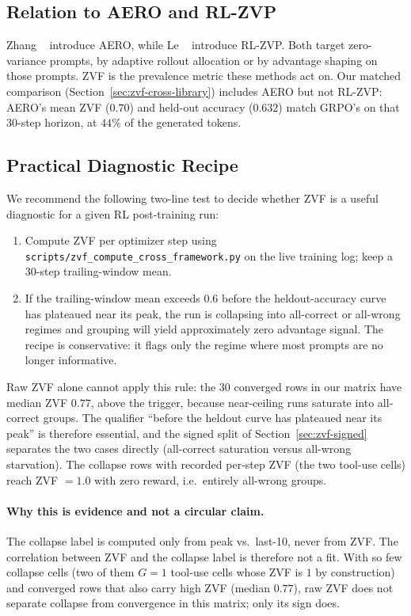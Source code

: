 \subsection{Relation to AERO and RL-ZVP}
\label{sec:zvf-cross-experiment:aero}

Zhang \etal~\cite{zhang2026aero} introduce AERO, while
Le \etal~\cite{le2025rlzvp} introduce RL-ZVP. Both target zero-variance prompts,
by adaptive rollout allocation or by advantage shaping on those prompts. ZVF is
the prevalence metric these methods act on. Our matched comparison
(Section~\ref{sec:zvf-cross-library}) includes AERO but not RL-ZVP: AERO's mean ZVF
($0.70$) and held-out accuracy ($0.632$) match GRPO's on that 30-step horizon,
at $44\%$ of the generated tokens.

\subsection{Practical Diagnostic Recipe}

We recommend the following two-line test to decide whether ZVF is
a useful diagnostic for a given RL post-training run:
\begin{enumerate}
\item Compute ZVF per optimizer step using
      \texttt{scripts/zvf\_compute\_cross\_framework.py} on the live
      training log; keep a $30$-step trailing-window mean.
\item If the trailing-window mean exceeds $0.6$ before the
      heldout-accuracy curve has plateaued near its peak, the run
      is collapsing into all-correct or all-wrong regimes and
      grouping will yield approximately zero advantage signal. The
      recipe is conservative: it flags only the regime where most
      prompts are no longer informative.
\end{enumerate}
Raw ZVF alone cannot apply this rule: the 30 converged rows in our matrix have
median ZVF $0.77$, above the trigger, because near-ceiling runs saturate into
all-correct groups. The qualifier ``before the heldout curve has plateaued near
its peak'' is therefore essential, and the signed split of
Section~\ref{sec:zvf-signed} separates the two cases directly (all-correct
saturation versus all-wrong starvation). The collapse rows with recorded per-step
ZVF (the two tool-use cells) reach ZVF $=1.0$ with zero reward, i.e.\ entirely
all-wrong groups.

\paragraph{Why this is evidence and not a circular claim.}
The collapse label is computed only from peak vs.\ last-10, never
from ZVF. The correlation between ZVF and the collapse label is
therefore not a fit. With so few collapse cells (two of them $G{=}1$
tool-use cells whose ZVF is $1$ by construction) and converged rows that also
carry high ZVF (median $0.77$), raw ZVF does not separate collapse from
convergence in this matrix; only its sign does.

